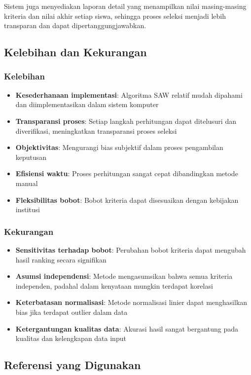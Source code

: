 \documentclass[10pt,a4paper]{article}
\begin{document}
Sistem juga menyediakan laporan detail yang menampilkan nilai masing-masing kriteria dan nilai akhir setiap siswa, sehingga proses seleksi menjadi lebih transparan dan dapat dipertanggungjawabkan.

\subsection{Kelebihan dan Kekurangan}

\subsubsection{Kelebihan}
\begin{itemize}
    \item \textbf{Kesederhanaan implementasi}: Algoritma SAW relatif mudah dipahami dan diimplementasikan dalam sistem komputer
    \item \textbf{Transparansi proses}: Setiap langkah perhitungan dapat ditelusuri dan diverifikasi, meningkatkan transparansi proses seleksi
    \item \textbf{Objektivitas}: Mengurangi bias subjektif dalam proses pengambilan keputusan
    \item \textbf{Efisiensi waktu}: Proses perhitungan sangat cepat dibandingkan metode manual
    \item \textbf{Fleksibilitas bobot}: Bobot kriteria dapat disesuaikan dengan kebijakan institusi
\end{itemize}

\subsubsection{Kekurangan}
\begin{itemize}
    \item \textbf{Sensitivitas terhadap bobot}: Perubahan bobot kriteria dapat mengubah hasil ranking secara signifikan
    \item \textbf{Asumsi independensi}: Metode mengasumsikan bahwa semua kriteria independen, padahal dalam kenyataan mungkin terdapat korelasi
    \item \textbf{Keterbatasan normalisasi}: Metode normalisasi linier dapat menghasilkan bias jika terdapat outlier dalam data
    \item \textbf{Ketergantungan kualitas data}: Akurasi hasil sangat bergantung pada kualitas dan kelengkapan data input
\end{itemize}

\subsection{Referensi yang Digunakan}
\end{document}
